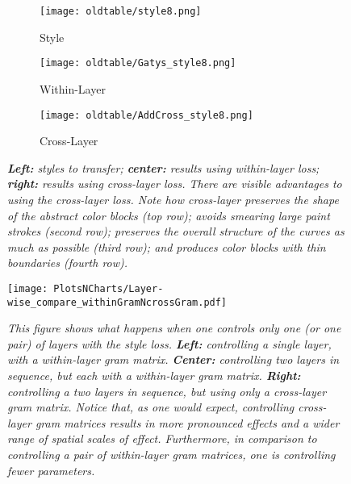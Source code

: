 \begin{figure}[!htbp]
    \begin{subfigure}[b]{0.3\linewidth}
      \texttt{[image: oldtable/style8.png]}
  \caption{Style}
    \end{subfigure}
    \begin{subfigure}[b]{0.3\linewidth}
      \texttt{[image: oldtable/Gatys\_style8.png]}
  \caption{Within-Layer}
    \end{subfigure}
    \begin{subfigure}[b]{0.3\linewidth}
      \texttt{[image: oldtable/AddCross\_style8.png]}
  \caption{Cross-Layer}
    \end{subfigure} 
      \caption{\em {\bf Left:} styles to transfer; {\bf center:} results using within-layer
      loss; {\bf right:} results using cross-layer loss.  There are
      visible advantages to using the cross-layer loss. Note how cross-layer preserves the shape of the abstract color blocks (top row); 
  avoids smearing large paint strokes (second row); preserves the overall structure of the curves as much as possible
  (third row); and produces color blocks with thin boundaries (fourth row).
    }\label{fig:cf2}
  \end{figure}
  
  \begin{figure}[h]
  \centering
  \texttt{[image: PlotsNCharts/Layer-wise\_compare\_withinGramNcrossGram.pdf]}
  
  
  \caption{\em This figure shows what happens when one controls only one (or one pair) of layers with the style loss.
  {\bf Left:} controlling a single layer, with a within-layer gram matrix.  {\bf Center:} controlling two
  layers in sequence, but each with a within-layer gram matrix.  {\bf Right:} controlling a two layers
  in sequence, but using only a cross-layer gram matrix.  Notice that, as one would expect, controlling
  cross-layer gram matrices results in more pronounced effects and a wider range of spatial scales of effect.
  Furthermore, in comparison to controlling  a pair of within-layer gram matrices, one is controlling fewer
  parameters.}
  \label{fig:layer_wise}
  \end{figure}
  
